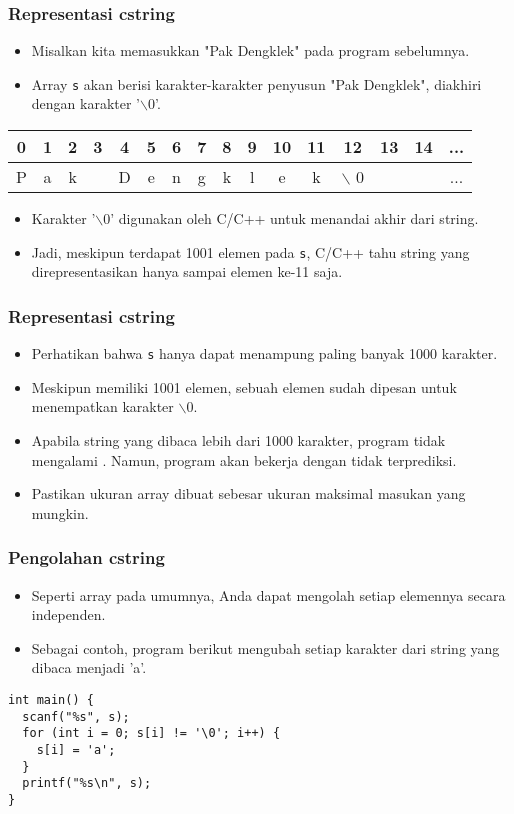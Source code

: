 \begin{frame}
\frametitle{Representasi cstring}
\begin{itemize}
  \item Misalkan kita memasukkan "Pak Dengklek" pada program sebelumnya.
  \item Array \texttt{s} akan berisi karakter-karakter penyusun "Pak Dengklek", diakhiri dengan karakter '$\backslash$0'.
\end{itemize}
\begin{tabular}{|c|c|c|c|c|c|c|c|c|c|c|c|c|c|c|c|}
\hline 0 & 1 & 2 & 3 & 4 & 5 & 6 & 7 & 8 & 9 & 10 & 11 & 12 & 13 & 14 & ...\\ 
\hline P & a & k &  & D & e & n & g & k & l & e & k & $\backslash$ 0 & & & ...\\ 
\hline 
\end{tabular} 
\begin{itemize}
  \item Karakter '$\backslash$0' digunakan oleh C/C++ untuk menandai akhir dari string.
  \item Jadi, meskipun terdapat 1001 elemen pada \texttt{s}, C/C++ tahu string yang direpresentasikan hanya sampai elemen ke-11 saja.
\end{itemize}
\end{frame}

\begin{frame}
\frametitle{Representasi cstring}
\begin{itemize}
  \item Perhatikan bahwa \texttt{s} hanya dapat menampung paling banyak 1000 karakter.
  \item Meskipun memiliki 1001 elemen, sebuah elemen sudah dipesan untuk menempatkan karakter $\backslash$0.
  \item Apabila string yang dibaca lebih dari 1000 karakter, program tidak mengalami . Namun, program akan bekerja dengan tidak terprediksi.
  \item Pastikan ukuran array dibuat sebesar ukuran maksimal masukan yang mungkin.
\end{itemize}
\end{frame}

\begin{frame}[fragile]
\frametitle{Pengolahan cstring}
\begin{itemize}
  \item Seperti array pada umumnya, Anda dapat mengolah setiap elemennya secara independen.
  \item Sebagai contoh, program berikut mengubah setiap karakter dari string yang dibaca menjadi 'a'.
\end{itemize}
\begin{lstlisting}
int main() {
  scanf("%s", s);
  for (int i = 0; s[i] != '\0'; i++) {
    s[i] = 'a';
  }
  printf("%s\n", s);
}
\end{lstlisting}
\end{frame}

